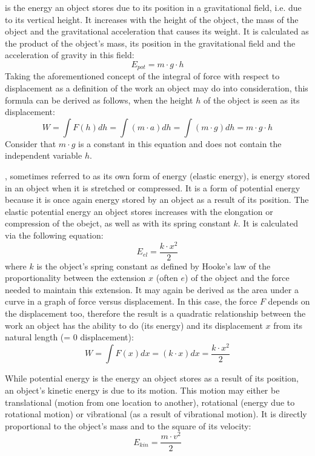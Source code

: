 \begin{itemize}
	 is the energy an object stores due to its position in a gravitational field, i.e. due to its vertical height. It increases with the height of the object, the mass of the object and the gravitational acceleration that causes its weight. It is calculated as the product of the object's mass, its position in the gravitational field and the acceleration of gravity in this field: $$E_{pot} = m \cdot g \cdot h$$ Taking the aforementioned concept of the integral of force with respect to displacement as a definition of the work an object may do into consideration, this formula can be derived as follows, when the height $h$ of the object is seen as its displacement: $$W = \int F(h) dh = \int (m \cdot a) dh = \int (m \cdot g) dh = m \cdot g \cdot h$$ Consider that $m \cdot g$ is a constant in this equation and does not contain the independent variable $h$.

	, sometimes referred to as its own form of energy (elastic energy), is energy stored in an object when it is stretched or compressed. It is a form of potential energy because it is once again energy stored by an object as a result of its position. The elastic potential energy an object stores increases with the elongation or compression of the obejct, as well as with its spring constant $k$. It is calculated via the following equation: $$E_{el} = \frac{k \cdot x^2}{2}$$ where $k$ is the object's spring constant as defined by Hooke's law of the proportionality between the extension $x$ (often $e$) of the object and the force needed to maintain this extension. It may again be derived as the area under a curve in a graph of force versus displacement. In this case, the force $F$ depends on the displacement too, therefore the result is a quadratic relationship between the work an object has the ability to do (its energy) and its displacement $x$ from its natural length (= 0 displacement): $$W = \int F(x) dx = (k \cdot x) dx = \frac{k \cdot x^2}{2}$$
\end{itemize}


While potential energy is the energy an object stores as a result of its position, an object's kinetic energy is due to its motion. This motion may either be translational (motion from one location to another), rotational (energy due to rotational motion) or vibrational (as a result of vibrational motion). It is directly proportional to the object's mass and to the square of its velocity: $$E_{kin} = \frac{m \cdot v^2}{2}$$

